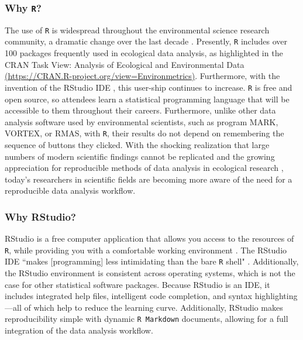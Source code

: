 \documentclass[12pt]{article}
\begin{document}
\subsubsection{Why \texttt{R}?} 

\quad The use of \texttt{R} is widespread throughout the environmental science
research community, a dramatic change over the last decade \citep{Rpopular}. 
Presently, \texttt{R} includes over 100 packages frequently used in ecological
data analysis, as highlighted in the CRAN Task View: Analysis of Ecological and
Environmental Data \href{https://CRAN.R-project.org/view=Environmetrics}{(https://CRAN.R-project.org/view=Environmetrics)}. Furthermore, with the invention of the RStudio IDE 
\citep{rstudio}, this user-ship continues to increase. \texttt{R} is free and
open source, so attendees learn a statistical programming language that will be
accessible to them throughout their careers. Furthermore, unlike other data
analysis software used by environmental scientists, such as program MARK,
VORTEX, or RMAS, with \texttt{R}, their results do not depend on remembering the
sequence of buttons they clicked. With the shocking realization that large 
numbers of modern scientific findings cannot be replicated \citep{economist, 
johnson} and the growing appreciation for reproducible methods of data analysis
in ecological research \citep{reproducibilty-comment, repeatability, pva,
reproducibility_ecology}, today's researchers in scientific fields are becoming 
more aware of the need for a reproducible data analysis workflow. 

\subsubsection{Why RStudio?}

\quad RStudio is a free computer application that allows you access to the 
resources of \texttt{R}, while providing you with a comfortable working
environment \citep{rstudio}. The RStudio IDE ``makes [programming] less 
intimidating than the bare \texttt{R} shell" \citep[p. 59]{mine}. Additionally, 
the RStudio environment is consistent across operating systems, which is not the
case for other statistical software packages. Because RStudio is an IDE, it
includes integrated help files, intelligent code completion, and syntax
highlighting---all of which help to reduce the learning curve. Additionally,
RStudio makes reproducibility simple with dynamic \texttt{R Markdown} documents,
allowing for a full integration of the data analysis workflow.
\end{document}
